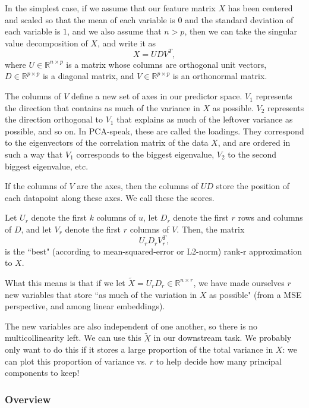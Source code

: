 In the simplest case, if we assume that our feature matrix $X$ has been centered and scaled so that the mean of each variable is $0$ and the standard deviation of each variable is $1$, and we also assume that $n > p$, then we can take the singular value decomposition of $X$, and write it as 
$$
X = U D V^T, 
$$
where $U \in \mathbb{R}^{n \times p}$ is a matrix whose columns are orthogonal unit vectors, $D \in \mathbb{R}^{p \times p}$ is a diagonal matrix, and $V \in \mathbb{R}^{p \times p}$ is an orthonormal matrix. 

The columns of $V$ define a new set of axes in our predictor space. $V_1$ represents the direction that contains as much of the variance in $X$ as possible. $V_2$ represents the direction orthogonal to $V_1$ that explains as much of the leftover variance as possible, and so on. In PCA-speak, these are called the loadings. They correspond to the eigenvectors of the correlation matrix of the data $X$, and are ordered in such a way that $V_1$ corresponds to the biggest eigenvalue, $V_2$ to the second biggest eigenvalue, etc. 

If the columns of $V$ are the axes, then the columns of $U D$ store the position of each datapoint along these axes. We call these the scores. 

Let $U_{r}$ denote the first $k$ columns of $u$, let $D_r$ denote the first $r$ rows and columns of $D$, and let $V_r$ denote the first $r$ columns of $V$. Then, the matrix
$$
U_r D_r V_r^T, 
$$
is the ``best" (according to mean-squared-error or L2-norm) rank-r approximation to $X$. 

What this means is that if we let $\tilde{X} = U_r D_r \in \mathbb{R}^{n \times r}$, we have made ourselves $r$ new variables that store ``as much of the variation in $X$ as possible" (from a MSE perspective, and among linear embeddings). 

 The new variables are also independent of one another, so there is no multicollinearity left. We can use this $\tilde{X}$ in our downstream task. We probably only want to do this if it stores a large proportion of the total variance in $X$: we can plot this proportion of variance vs. $r$ to help decide how many principal components to keep! 



\subsubsection{Overview}

